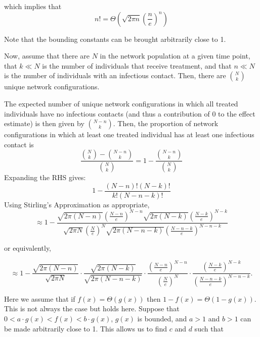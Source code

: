 \documentclass{article}
\theoremstyle{definition}
\begin{document}
\noindent which implies that
$$n!= \Theta\left(\sqrt{2\pi n}\left(\frac{n}{e}\right)^n \right)$$


\noindent Note that the bounding constants can be brought arbitrarily close to 1.

Now, assume that there are $N$ in the network population at a given time point, that $k\ll N$ is the number of individuals that receive treatment, and that $n\ll N$ is the number of individuals with an infectious contact. Then, there are $\binom{N}{k}$ unique network configurations.
 
The expected number of unique network configurations in which all treated individuals have no infectious contacts (and thus a contribution of 0 to the effect estimate) is then given by $\binom{N-n}{k}$. Then, the proportion of network configurations in which at least one treated individual has at least one infectious contact is 
\begin{equation} 
\frac{{\binom{N}{k}}-{\binom{N-n}{k}}}{{\binom{N}{k}}}=1-\frac{{\binom{N-n}{k}}}{{\binom{N}{k}}}  \nonumber
\end{equation}
Expanding the RHS gives:
\begin{equation}
1-\frac{\left(N-n\right)!\left(N-k\right)!}{k!\left(N-n-k\right)!} \nonumber
\end{equation}
Using Stirling's Approximation as appropriate,
\begin{equation}
\approx 1-\frac{\sqrt{2\pi\left(N-n\right)}\left(\frac{N-n}{e}\right)^{N-n}\sqrt{2\pi\left(N-k\right)}\left(\frac{N-k}{e}\right)^{N-k}}{\sqrt{2\pi N}\left(\frac{N}{e}\right)^{N}\sqrt{2\pi \left(N-n-k\right)}\left(\frac{N-n-k}{e}\right)^{N-n-k}}     \nonumber
\end{equation}

\noindent or equivalently, 

\begin{equation} \label{eq:19}
\approx 1-\frac{\sqrt{2\pi \left(N-n\right)}}{\sqrt{2\pi N}}\cdot\frac{\sqrt{2 \pi \left(N-k\right)}}{\sqrt{2 \pi \left(N-n-k\right)}}\cdot\frac{\left(\frac{N-n}{e}\right)^{N-n}}
{\left(\frac{N}{e}\right)^{N}}\cdot\frac{\left(\frac{N-k}{e}\right)^{N-k}}{\left(\frac{N-n-k}{e}\right)^{N-n-k}}.    
\end{equation}

\noindent Here we assume that if $f(x)=\Theta(g(x))$ then $1-f(x)=\Theta(1-g(x))$. This is not always the case but holds here. Suppose that $0<a \cdot g(x)<f(x)<b \cdot g(x)$, $g(x)$ is bounded, and $a>1$ and $b>1$ can be made arbitrarily close to 1. This allows us to find $c$ and $d$ such that
\end{document}
